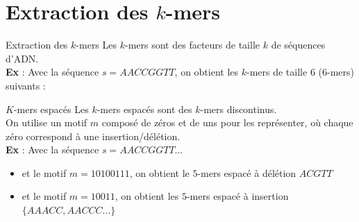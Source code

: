 \documentclass[11pt]{beamer}
\begin{document}
\section{Extraction des $k$-mers}
\begin{frame}[fragile]{Extraction des $k$-mers}
  Les $k$-mers sont des facteurs de taille $k$ de séquences d'ADN.\medskip\\\pause
  \textbf{Ex} : Avec la séquence $s = AACCGGTT$, on obtient les $k$-mers de taille $6$ ($6$-mers) suivants :\\\pause
  \begin{center}\end{center}
\end{frame}
\begin{frame}[fragile]{$K$-mers espacés}
  Les $k$-mers espacés sont des $k$-mers discontinus.\pause\medskip\\
  On utilise un motif $m$ composé de zéros et de uns pour les représenter, où chaque zéro correspond à une insertion/délétion.\medskip\pause\\
  \textbf{Ex} : Avec la séquence $s=AACCGGTT$...\pause
  \begin{itemize}[<+-| alert@+>]
    \item et le motif $m=10100111$, on obtient le $5$-mers espacé à délétion $ACGTT$
    \item et le motif $m=10011$, on obtient les $5$-mers espacé à insertion $\{AAACC, AACCC...\}$
  \end{itemize}
\end{frame}
\end{document}
